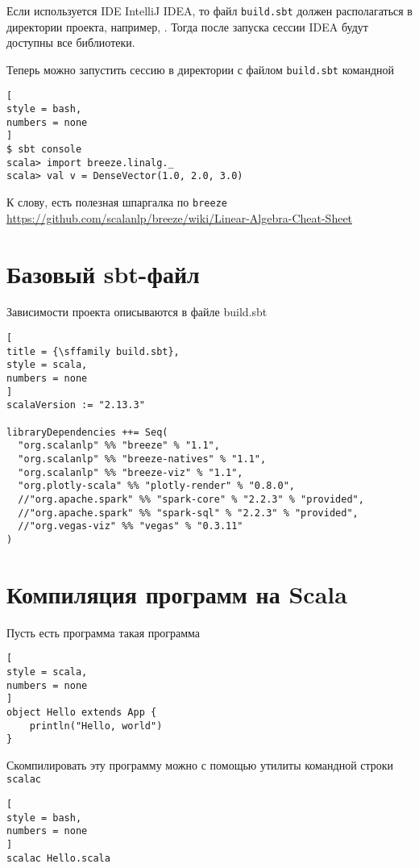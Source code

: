 \documentclass[%
	11pt,
	a4paper,
	utf8,
		]{article}
\begin{document}
Если используется IDE IntelliJ IDEA, то файл \texttt{build.sbt} должен располагаться в директории проекта, например, . Тогда после запуска сессии IDEA будут доступны все библиотеки.

Теперь можно запустить сессию в директории с файлом \texttt{build.sbt} командной
\begin{lstlisting}[
style = bash,
numbers = none
]
$ sbt console
scala> import breeze.linalg._
scala> val v = DenseVector(1.0, 2.0, 3.0)
\end{lstlisting}

К слову, есть полезная шпаргалка по \texttt{breeze} \url{https://github.com/scalanlp/breeze/wiki/Linear-Algebra-Cheat-Sheet}

\section{Базовый sbt-файл}

Зависимости проекта описываются в файле \textsf{build.sbt}

\begin{lstlisting}[
title = {\sffamily build.sbt},
style = scala,
numbers = none	
]
scalaVersion := "2.13.3"

libraryDependencies ++= Seq(
  "org.scalanlp" %% "breeze" % "1.1",
  "org.scalanlp" %% "breeze-natives" % "1.1",
  "org.scalanlp" %% "breeze-viz" % "1.1",
  "org.plotly-scala" %% "plotly-render" % "0.8.0",
  //"org.apache.spark" %% "spark-core" % "2.2.3" % "provided",
  //"org.apache.spark" %% "spark-sql" % "2.2.3" % "provided",
  //"org.vegas-viz" %% "vegas" % "0.3.11"
)
\end{lstlisting}


\section{Компиляция программ на Scala}

Пусть есть программа такая программа
\begin{lstlisting}[
style = scala,
numbers = none	
]
object Hello extends App {
	println("Hello, world")
}
\end{lstlisting}

Скомпилировать эту программу можно с помощью утилиты командной строки \texttt{scalac}
\begin{lstlisting}[
style = bash,
numbers = none	
]
scalac Hello.scala
\end{lstlisting}
\end{document}
